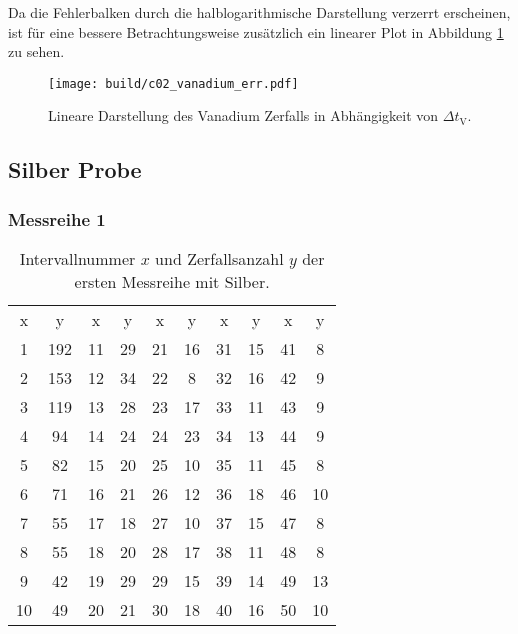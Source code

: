 \noindent
Da die Fehlerbalken durch die halblogarithmische Darstellung verzerrt erscheinen, ist für eine bessere Betrachtungsweise zusätzlich ein linearer
Plot in Abbildung \ref{fig:vanadium_err} zu sehen.
\begin{figure}[H]
    \centering
    \texttt{[image: build/c02\_vanadium\_err.pdf]}
    \caption[]{Lineare Darstellung des Vanadium Zerfalls in Abhängigkeit von $\Delta t_\text{V}$.}
    \label{fig:vanadium_err}
\end{figure}



\subsection{Silber Probe}

\subsubsection{Messreihe 1}

\begin{table}[H]
    \centering
    \caption[short]{Intervallnummer $x$ und Zerfallsanzahl $y$ der ersten Messreihe mit Silber.}
    \label{tab:silber1}
    \begin{tabular}{S S[table-format=3.0] S S S S S S S S}
        \toprule
        {x} & {y} & {x} & {y} & {x} & {y} & {x} & {y} & {x} & {y} \\
        \cmidrule(lr){1-2} \cmidrule(lr){3-4} \cmidrule(lr){5-6}  \cmidrule(lr){7-8} \cmidrule(lr){9-10}
        1 & 192 & 11 & 29 & 21 & 16 & 31 & 15 & 41 &  8 \\
        2 & 153 & 12 & 34 & 22 &  8 & 32 & 16 & 42 &  9 \\
        3 & 119 & 13 & 28 & 23 & 17 & 33 & 11 & 43 &  9 \\
        4 &  94 & 14 & 24 & 24 & 23 & 34 & 13 & 44 &  9 \\
        5 &  82 & 15 & 20 & 25 & 10 & 35 & 11 & 45 &  8 \\
        6 &  71 & 16 & 21 & 26 & 12 & 36 & 18 & 46 & 10 \\
        7 &  55 & 17 & 18 & 27 & 10 & 37 & 15 & 47 &  8 \\
        8 &  55 & 18 & 20 & 28 & 17 & 38 & 11 & 48 &  8 \\
        9 &  42 & 19 & 29 & 29 & 15 & 39 & 14 & 49 & 13 \\
       10 &  49 & 20 & 21 & 30 & 18 & 40 & 16 & 50 & 10 \\
        \bottomrule
    \end{tabular}
\end{table}

